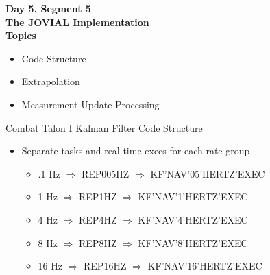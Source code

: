 \begin{frame}
\textbf{Day 5, Segment 5\\
The JOVIAL Implementation\\
Topics}
 \begin{itemize}
 \item Code Structure
 \item Extrapolation
 \item Measurement Update Processing
\end{itemize}
\end{frame}
\begin{frame}
Combat Talon I Kalman Filter Code Structure
\begin{itemize}
  \item Separate tasks and real-time execs for each rate group
	\begin{itemize}
		\item .1 Hz $\Rightarrow$ REP005HZ $\Rightarrow$  KF'NAV'05'HERTZ'EXEC
		\item 1 Hz $\Rightarrow$ REP1HZ $\Rightarrow$ KF'NAV'1'HERTZ'EXEC
		\item 4 Hz $\Rightarrow$ REP4HZ $\Rightarrow$ KF'NAV'4'HERTZ'EXEC
		\item 8 Hz $\Rightarrow$ REP8HZ $\Rightarrow$ KF'NAV'8'HERTZ'EXEC
		\item 16 Hz $\Rightarrow$ REP16HZ $\Rightarrow$ KF'NAV'16'HERTZ'EXEC
	\end{itemize}
\end{itemize} 
\end{frame}


%
%

% 
% 
